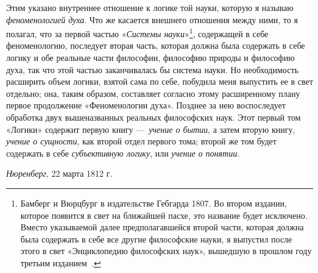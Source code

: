 Этим указано внутреннее отношение к логике той науки, которую я называю
{\em феноменологией духа}. Что же касается внешнего
отношения между ними, то я полагал, что за первой частью
«{\em Системы науки}»\footnote{ Бамберг и Вюрцбург в
издательстве Гебгарда 1807. Во втором издании, которое появится в свет на
ближайшей пасхе, это название будет исключено. Вместо указываемой далее
предполагавшейся второй части, которая должна была содержать в себе все
другие философские науки, я выпустил после этого в свет «Энциклопедию
философских наук», вышедшую в прошлом году третьим
изданием~.},
содержащей в себе феноменологию, последует вторая часть, которая должна
была содержать в себе логику и обе реальные части философии, философию
природы и философию духа, так что этой частью заканчивалась бы система
науки. Но необходимость расширить объем логики, взятой сама по себе,
побудила меня выпустить ее в свет отдельно; она, таким образом, составляет
согласно этому расширенному плану первое продолжение «Феноменологии духа».
Позднее за нею воспоследует обработка двух вышеназванных реальных
философских наук. Этот первый том «Логики» содержит первую книгу
—~{\em учение о бытии}, а затем вторую книгу,
{\em учение о сущности}, как второй отдел первого тома;
второй же том будет содержать в себе {\em субъективную
логику}, или {\em учение о понятии}.

{\em Нюренберг}, 22 марта 1812 г.
\bigskip
